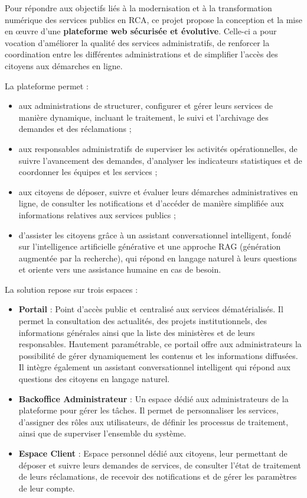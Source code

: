 Pour répondre aux objectifs liés à la modernisation et à la transformation numérique des services publics en RCA, ce projet propose la conception et la mise en œuvre d’une \textbf{plateforme web sécurisée et évolutive}. Celle-ci a pour vocation d’améliorer la qualité des services administratifs, de renforcer la coordination entre les différentes administrations et de simplifier l’accès des citoyens aux démarches en ligne.

La plateforme permet :

\begin{itemize}
    \item aux administrations de structurer, configurer et gérer leurs services de manière dynamique, incluant le traitement, le suivi et l’archivage des demandes et des réclamations ;
    \item aux responsables administratifs de superviser les activités opérationnelles, de suivre l’avancement des demandes, d’analyser les indicateurs statistiques et de coordonner les équipes et les services ;
    \item aux citoyens de déposer, suivre et évaluer leurs démarches administratives en ligne, de consulter les notifications et d’accéder de manière simplifiée aux informations relatives aux services publics ;
    \item d’assister les citoyens grâce à un assistant conversationnel intelligent, fondé sur l’intelligence artificielle générative et une approche RAG (génération augmentée par la recherche), qui répond en langage naturel à leurs questions et oriente vers une assistance humaine en cas de besoin.
\end{itemize}

La solution repose sur trois espaces :

\begin{itemize}
    \item \textbf{Portail} : Point d’accès public et centralisé aux services dématérialisés. Il permet la consultation des actualités, des projets institutionnels, des informations générales ainsi que la liste des ministères et de leurs responsables. Hautement paramétrable, ce portail offre aux administrateurs la possibilité de gérer dynamiquement les contenus et les informations diffusées. Il intègre également un assistant conversationnel intelligent qui répond aux questions des citoyens en langage naturel.
    \item \textbf{Backoffice Administrateur} : Un espace dédié aux administrateurs de la plateforme pour gérer les tâches. Il permet de personnaliser les services, d'assigner des rôles aux utilisateurs, de définir les processus de traitement, ainsi que de superviser l'ensemble du système.
    \item \textbf{Espace Client} : Espace personnel dédié aux citoyens, leur permettant de déposer et suivre leurs demandes de services, de consulter l’état de traitement de leurs réclamations, de recevoir des notifications et de gérer les paramètres de leur compte.
\end{itemize}

